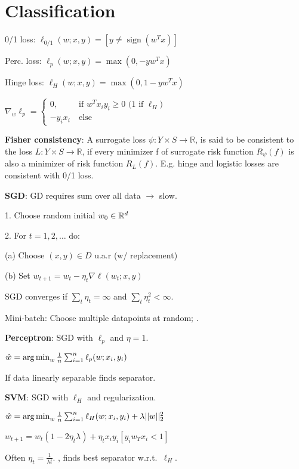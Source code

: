 \section{Classification}
0/1 loss: $\ell_{0/1}(w; x, y) = [y \neq  \operatorname{sign}(w^T x)]$

Perc. loss: $\ell_p(w; x, y) = \max(0, -yw^Tx)$

Hinge loss: $\ell_H(w; x, y) = \max(0, 1-yw^Tx)$

$ \nabla_w \ell_p = \begin{cases} 0,&\ \text{if $w^T x_i y_i \geq 0$ ($1$ if $\ell_H$)} \\ -y_i x_i&\ \text{else}\end{cases}$

\textbf{Fisher consistency}: A surrogate loss $\psi : Y \times S \rightarrow \mathbb{R}$, is said to be consistent to the loss $L : Y \times S \rightarrow \mathbb{R}$, if every minimizer f of surrogate risk function $R_{\psi}(f)$ is also a minimizer of risk function $R_L (f)$. E.g. hinge and logistic losses are consistent with 0/1 loss.

\textbf{SGD}: GD requires sum over all data $\rightarrow$ slow.

1. Choose random initial $w_0 \in \mathbb{R}^d$

2. For $t = 1, 2, \dots$ do:

(a) Choose $(x, y) \in D$ u.a.r (w/ replacement)

(b) Set $w_{t+1} = w_t - \eta_t \nabla \ell(w_t; x, y)$

SGD converges if $\sum_t \eta_t = \infty$ and $\sum_t \eta_t^2 < \infty$.

Mini-batch: Choose multiple datapoints at random; .

\textbf{Perceptron}: SGD with $\ell_p$ and $\eta = 1$.

$\hat{w} =\operatorname*{arg\,min}_w \frac{1}{n} \sum_{i=1}^n \ell_p(w; x_i, y_i)$

If data linearly separable finds separator.

\textbf{SVM}: SGD with $\ell_H$ and regularization.

$\hat{w} =\operatorname*{arg\,min}_w \frac{1}{n} \sum_{i=1}^n \ell_H(w; x_i, y_i) + \lambda ||w||_2^2$

$w_{t+1} = w_t (1 - 2 \eta_t \lambda) + \eta_t x_i y_i [y_i w_T x_i < 1]$ 

Often $\eta_t = \frac{1}{\lambda t}$. , finds best
separator w.r.t.\ $\ell_H$.